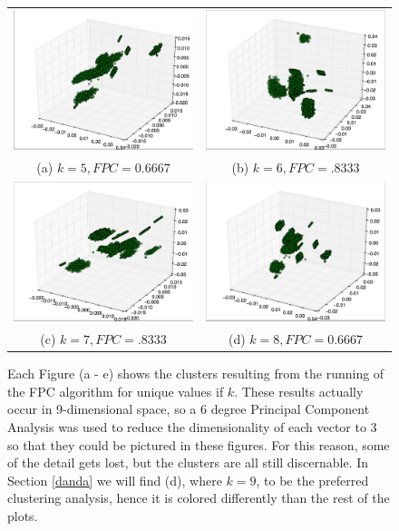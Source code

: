 \documentclass[letterpaper, 12pt]{article}
\begin{document}
\begin{figure}[H]
\centering
\caption{\label{clusterfig} Each Figure (a - e) shows the clusters resulting from the running of the FPC algorithm for unique values if $k$. These results actually occur in 9-dimensional space, so a 6 degree Principal Component Analysis was used to reduce the dimensionality of each vector to 3 so that they could be pictured in these figures. For this reason, some of the detail gets lost, but the clusters are all still discernable. In Section \ref{danda} we will find (d), where $k = 9$, to be the preferred clustering analysis, hence it is colored differently than the rest of the plots.}
\begin{tabular}{cc}
  \includegraphics[width=65mm]{k5} &   \includegraphics[width=65mm]{k6} \\
(a) $k = 5, FPC = 0.6667$ & (b) $k = 6, FPC = .8333$ \\[6pt]
 \includegraphics[width=65mm]{k7} &   \includegraphics[width=65mm]{k8} \\
(c) $k = 7, FPC = .8333$ & (d) $k = 8, FPC =  0.6667$ \\[6pt]
\end{tabular}
\end{figure}
\end{document}

